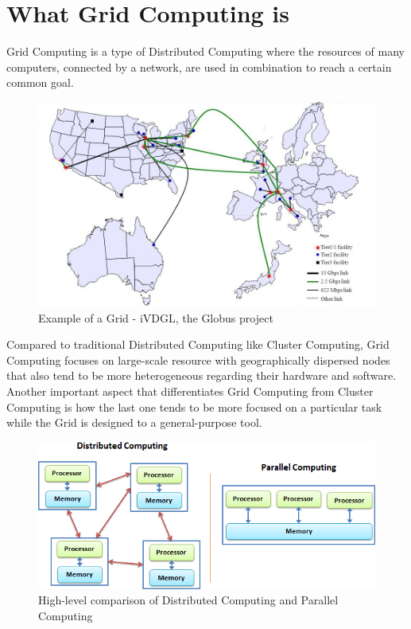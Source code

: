 \section{What Grid Computing is}
Grid Computing is a type of Distributed Computing where the resources of many computers, connected by a network, are used in combination to reach a certain common goal.

\begin{figure}[!ht]
    \centering
    \includegraphics[scale=0.51]{document/chapters/chapter_1/images/iVDGL_globus.jpg}
    \caption{Example of a Grid - iVDGL, the Globus project \cite{iVDGL}}
    \label{fig:iVDGL}
\end{figure}

Compared to traditional Distributed Computing like Cluster Computing, Grid Computing focuses on large-scale resource with geographically dispersed nodes that also tend to be more heterogeneous regarding their hardware and software.
Another important aspect that differentiates Grid Computing from Cluster Computing is how the last one tends to be more focused on a particular task while the Grid is designed to a general-purpose tool.

\vspace{10mm}
\begin{figure}[!ht]
    \centering
    \includegraphics[width=\linewidth]{document/chapters/chapter_1/images/distributed_computing_vs_parallel_computing.png}
    \caption{High-level comparison of Distributed Computing and Parallel Computing \cite{distributed_vs_parallel}}
    \label{fig:distributed_vs_parallel}
\end{figure}
\vspace{7mm}

